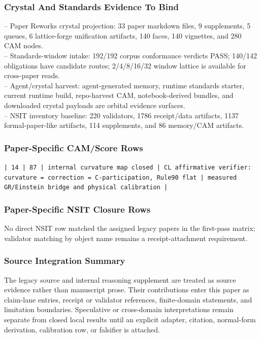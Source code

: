 \documentclass[11pt]{article}
\begin{document}
\subsubsection*{Crystal And Standards Evidence To Bind}

\noindent{}-- Paper Reworks crystal projection: 33 paper markdown files, 9 supplements, 5 queues, 6 lattice-forge unification artifacts, 140 faces, 140 vignettes, and 280 CAM nodes.\\
\noindent{}-- Standards-window intake: 192/192 corpus conformance verdicts PASS; 140/142 obligations have candidate routes; 2/4/8/16/32 window lattice is available for cross-paper reads.\\
\noindent{}-- Agent/crystal harvest: agent-generated memory, runtime standards starter, current runtime build, repo-harvest CAM, notebook-derived bundles, and downloaded crystal payloads are orbital evidence surfaces.\\
\noindent{}-- NSIT inventory baseline: 220 validators, 1786 receipt/data artifacts, 1137 formal-paper-like artifacts, 114 supplements, and 86 memory/CAM artifacts.\\

\subsubsection*{Paper-Specific CAM/Score Rows}

\noindent\texttt{| 14 | 87 | internal curvature map closed | CL affirmative verifier: curvature = correction = C-participation, Rule90 flat | measured GR/Einstein bridge and physical calibration |}\\

\subsubsection*{Paper-Specific NSIT Closure Rows}

No direct NSIT row matched the assigned legacy papers in the first-pass matrix; validator matching by object name remains a receipt-attachment requirement.

\subsubsection*{Source Integration Summary}

The legacy source and internal reasoning supplement are treated as source
evidence rather than manuscript prose. Their contributions enter this paper as
claim-lane entries, receipt or validator references, finite-domain statements,
and limitation boundaries. Speculative or cross-domain interpretations remain
separate from closed local results until an explicit adapter, citation,
normal-form derivation, calibration row, or falsifier is attached.
\end{document}
